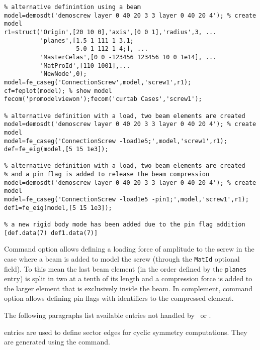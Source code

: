 \begin{SDT}
\begin{verbatim}
% alternative definintion using a beam
model=demosdt('demoscrew layer 0 40 20 3 3 layer 0 40 20 4'); % create model
r1=struct('Origin',[20 10 0],'axis',[0 0 1],'radius',3, ...
          'planes',[1.5 1 111 1 3.1;
                    5.0 1 112 1 4;], ...
          'MasterCelas',[0 0 -123456 123456 10 0 1e14], ...
          'MatProId',[110 1001],...
          'NewNode',0);
model=fe_caseg('ConnectionScrew',model,'screw1',r1);
cf=feplot(model); % show model 
fecom('promodelviewon');fecom('curtab Cases','screw1');

% alternative definition with a load, two beam elements are created
model=demosdt('demoscrew layer 0 40 20 3 3 layer 0 40 20 4'); % create model
model=fe_caseg('ConnectionScrew -load1e5;',model,'screw1',r1);
def=fe_eig(model,[5 15 1e3]);

% alternative definition with a load, two beam elements are created
% and a pin flag is added to release the beam compression
model=demosdt('demoscrew layer 0 40 20 3 3 layer 0 40 20 4'); % create model
model=fe_caseg('ConnectionScrew -load1e5 -pin1;',model,'screw1',r1);
def1=fe_eig(model,[5 15 1e3]);

% a new rigid body mode has been added due to the pin flag addition
[def.data(7) def1.data(7)]
\end{verbatim}%

\vs

Command option  allows defining a loading force of amplitude  to the screw in the case where a beam is added to model the screw (through the {\tt MatId} optional field). To this mean the last beam element (in the order defined by the {\tt planes} entry) is split in two at a tenth of its length and a compression force is added to the larger element that is exclusively inside the beam. In complement, command option  allows defining pin flags with identifiers  to the compressed \beam element.


\end{SDT}


The following paragraphs list available entries not handled by \feload\ or \upcom.


\rz{} entries are used to define sector edges for cyclic symmetry computations. They are generated using the  command.

